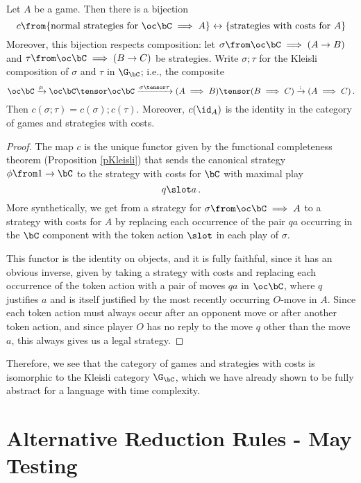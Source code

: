 \begin{proposition}
  Let $A$ be a game.  
  Then there is a bijection
  \[
    c \from \{\text{normal strategies for $\oc\bC \implies A$}\}\leftrightarrow\{\text{strategies with costs for $A$}\}
    \]
  Moreover, this bijection respects composition: let $\sigma \from\oc\bC \implies (A \to B)$ and $\tau \from \oc\bC \implies (B \to C)$ be strategies.  
  Write $\sigma;\tau$ for the Kleisli composition of $\sigma$ and $\tau$ in $\G_{\bC}$; i.e., the composite
  \[
    \oc\bC \xrightarrow{\mu}
    \oc\bC \tensor \oc\bC \xrightarrow{\sigma\tensor\tau}
    (A \implies B) \tensor (B \implies C) \xrightarrow{;}
    (A \implies C)\,.
    \]
  Then $c(\sigma;\tau)=c(\sigma);c(\tau)$.  
  Moreover, $c(\id_A)$ is the identity in the category of games and strategies with costs.
\end{proposition}
\begin{proof}
  The map $c$ is the unique functor given by the functional completeness theorem (Proposition \ref{pKleisli}) that sends the canonical strategy $\phi \from 1 \to \bC$ to the strategy with costs for $\bC$ with maximal play
  \[
    q\slot a\,.
    \]
  More synthetically, we get from a strategy for $\sigma\from\oc \bC \implies A$ to a strategy with costs for $A$ by replacing each occurrence of the pair $qa$ occurring in the $\bC$ component with the token action $\slot$ in each play of $\sigma$.

  This functor is the identity on objects, and it is fully faithful, since it has an obvious inverse, given by taking a strategy with costs and replacing each occurrence of the token action with a pair of moves $qa$ in $\oc\bC$, where $q$ justifies $a$ and is itself justified by the most recently occurring $O$-move in $A$.
  Since each token action must always occur after an opponent move or after another token action, and since player $O$ has no reply to the move $q$ other than the move $a$, this always gives us a legal strategy.
\end{proof}

Therefore, we see that the category of games and strategies with costs is isomorphic to the Kleisli category $\G_\bC$, which we have already shown to be fully abstract for a language with time complexity.

\section{Alternative Reduction Rules - May Testing}
\label{SecMayTesting}

